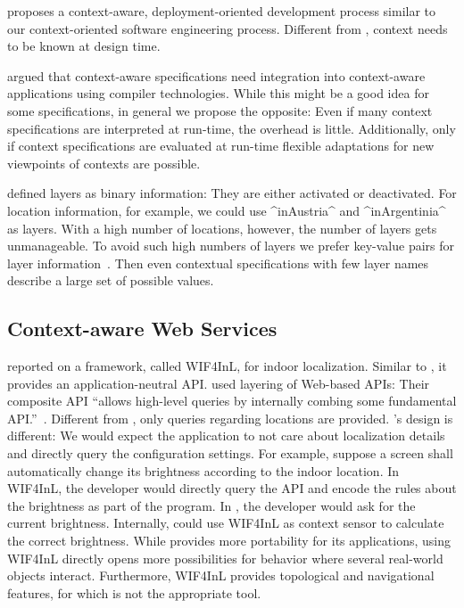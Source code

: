 \citet{lee2014deployment} proposes a context-aware, deployment-oriented development process similar to our context-oriented software engineering process.
Different from \elektra{}, context needs to be known at design time.


\citet{parra2007introducing} argued that context-aware specifications need integration into context-aware applications using compiler technologies.
While this might be a good idea for some specifications, in general we propose the opposite:
Even if many context specifications are interpreted at run-time, the overhead is little.
Additionally, only if context specifications are evaluated at run-time flexible adaptations for new viewpoints of contexts are possible.


\citet{kamina2014context} defined layers as binary information:
They are either activated or deactivated.
For location information, for example, we could use ^inAustria^ and ^inArgentinia^ as layers.
With a high number of locations, however, the number of layers gets unmanageable.
To avoid such high numbers of layers we prefer key-value pairs for layer information~\cite{keays2003context}.
Then even contextual specifications with few layer names describe a large set of possible values.


\subsection{Context-aware Web Services}

\citet{niu2016wif4inl} reported on a framework, called WIF4InL, for indoor localization.
Similar to \elektra{}, it provides an application-neutral API.
\citet{niu2016wif4inl} used layering of Web-based APIs:
Their composite API \enquote{allows high-level queries by internally combing some fundamental API.}~\cite{niu2016wif4inl}.
Different from \elektra{}, only queries regarding locations are provided.
\elektra{}'s design is different:
We would expect the application to not care about localization details and directly query the configuration settings.
For example, suppose a screen shall automatically change its brightness according to the indoor location.
In WIF4InL, the developer would directly query the API and encode the rules about the brightness as part of the program.
In \elektra{}, the developer would ask for the current brightness.
Internally, \elektra{} could use WIF4InL as context sensor to calculate the correct brightness.
While \elektra{} provides more portability for its applications, using WIF4InL directly opens more possibilities for behavior where several real-world objects interact.
Furthermore, WIF4InL provides topological and navigational features, for which \elektra{} is not the appropriate tool.

